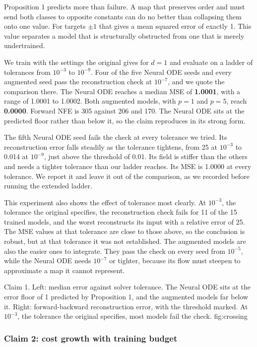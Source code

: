 Proposition 1 predicts more than failure. A map that preserves order and must send both
classes to opposite constants can do no better than collapsing them onto one value. For
targets $\pm 1$ that gives a mean squared error of exactly 1. This value separates a model
that is structurally obstructed from one that is merely undertrained.

We train with the settings the original gives for $d=1$ and evaluate on a ladder of
tolerances from $10^{-3}$ to $10^{-9}$. Four of the five Neural ODE seeds and every augmented
seed pass the reconstruction check at $10^{-7}$, and we quote the comparison there. The Neural
ODE reaches a median MSE of \textbf{1.0001}, with a range of 1.0001 to 1.0002. Both augmented
models, with $p=1$ and $p=5$, reach \textbf{0.0000}. Forward NFE is 305 against 206 and 170.
The Neural ODE sits at the predicted floor rather than below it, so the claim reproduces in its
strong form.

The fifth Neural ODE seed fails the check at every tolerance we tried. Its reconstruction error
falls steadily as the tolerance tightens, from 25 at $10^{-3}$ to 0.014 at $10^{-9}$, just above
the threshold of 0.01. Its field is stiffer than the others and needs a tighter tolerance than
our ladder reaches. Its MSE is 1.0000 at every tolerance. We report it and leave it out of the
comparison, as we recorded before running the extended ladder.

This experiment also shows the effect of tolerance most clearly. At $10^{-3}$, the tolerance the
original specifies, the reconstruction check fails for 11 of the 15 trained models, and the
worst reconstructs its input with a relative error of 25. The MSE values at that tolerance are
close to those above, so the conclusion is robust, but at that tolerance it was not
established. The augmented models are also the easier ones to integrate. They pass the check on every
seed from $10^{-5}$, while the Neural ODE needs $10^{-7}$ or tighter, because its flow must
steepen to approximate a map it cannot represent.

  {Claim 1. Left: median error against solver tolerance. The Neural ODE sits at the error
   floor of 1 predicted by Proposition 1, and the augmented models far below it. Right:
   forward-backward reconstruction error, with the threshold marked. At $10^{-3}$, the
   tolerance the original specifies, most models fail the check.}
  {fig:crossing}

\subsubsection{Claim 2: cost growth with training budget}

